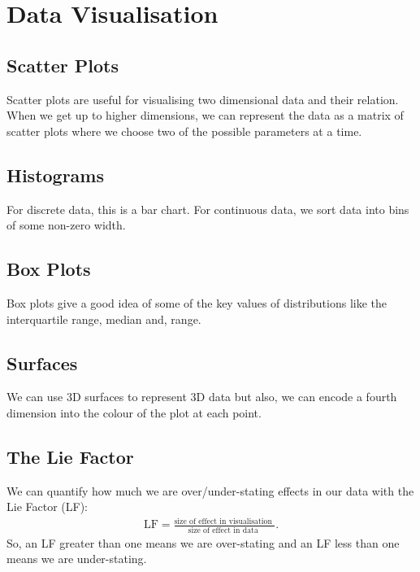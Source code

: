 \section{Data Visualisation}

\subsection{Scatter Plots}

Scatter plots are useful for visualising two dimensional data and their relation.
When we get up to higher dimensions, we can represent the data as a matrix of
scatter plots where we choose two of the possible parameters at a time.

\subsection{Histograms}

For discrete data, this is a bar chart. For continuous data, we sort data into
bins of some non-zero width.

\subsection{Box Plots}

Box plots give a good idea of some of the key values of distributions
like the interquartile range, median and, range.

\subsection{Surfaces}

We can use 3D surfaces to represent 3D data but also, we can encode a
fourth dimension into the colour of the plot at each point.

\subsection{The Lie Factor}

We can quantify how much we are over/under-stating effects in our data
with the Lie Factor (LF):
\begin{gather*}
    \text{LF} = \frac{\text{
        size of effect in visualisation
    }}{\text{
        size of effect in data
    }}.
\end{gather*} So, an LF greater than one means we are over-stating
and an LF less than one means we are under-stating.